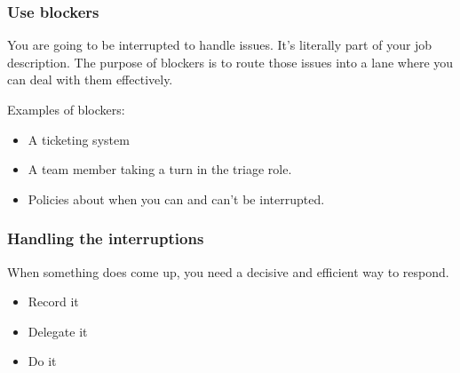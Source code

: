 \documentclass[10pt]{beamer}
\begin{document}
\begin{frame}
  \frametitle{Use blockers}
  
  You are going to be interrupted to handle issues. It's literally part of
  your job description. The purpose of blockers is to route those issues into
  a lane where you can deal with them effectively.
  
  Examples of blockers:
  
  \begin{itemize}
    \item A ticketing system
    \item A team member taking a turn in the triage role.
    \item Policies about when you can and can't be interrupted.
  \end{itemize}
     
\end{frame}

\begin{frame}
  \frametitle{Handling the interruptions}
  
    When something does come up, you need a decisive and efficient 
    way to respond.
    
    \begin{itemize}
    \item Record it
    \item Delegate it
    \item Do it    
    \end{itemize}
     
\end{frame}
\end{document}
